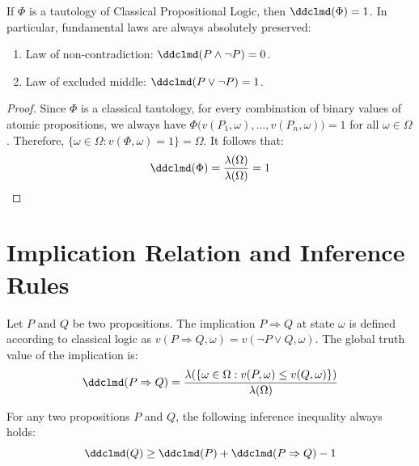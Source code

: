 \begin{theorem}
	If $\Phi$ is a tautology of Classical Propositional Logic, then $\ddclmd(\Phi) = 1$. In particular, fundamental laws are always absolutely preserved:
	\begin{enumerate}
		\item Law of non-contradiction: $\ddclmd(P \land \neg P) = 0$.
		\item Law of excluded middle: $\ddclmd(P \lor \neg P) = 1$.
	\end{enumerate}
\end{theorem}

\begin{proof}
	Since $\Phi$ is a classical tautology, for every combination of binary values of atomic propositions, we always have $\Phi\big(v(P_1, \omega), \dots, v(P_n, \omega)\big) = 1$ for all $\omega \in \Omega$.
	Therefore, $\{\omega \in \Omega : v(\Phi, \omega) = 1\} = \Omega$. It follows that:
	\[
	\ddclmd(\Phi) = \frac{\lambda(\Omega)}{\lambda(\Omega)} = 1
	\]
\end{proof}

\section{Implication Relation and Inference Rules}

\begin{definition}
	Let $P$ and $Q$ be two propositions. The implication $P \Rightarrow Q$ at state $\omega$ is defined according to classical logic as $v(P \Rightarrow Q, \omega) = v(\neg P \lor Q, \omega)$. The global truth value of the implication is:
	\[
	\ddclmd(P \Rightarrow Q) = \frac{\lambda(\{\omega \in \Omega : v(P, \omega) \le v(Q, \omega)\})}{\lambda(\Omega)}
	\]
\end{definition}

\begin{theorem}
	For any two propositions $P$ and $Q$, the following inference inequality always holds:
	\[
	\ddclmd(Q) \ge \ddclmd(P) + \ddclmd(P \Rightarrow Q) - 1
	\]
\end{theorem}

